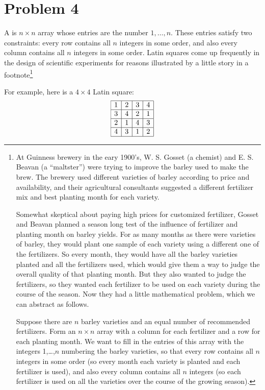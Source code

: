 \documentclass[12pt]{article}
\begin{document}
\section*{Problem 4}

A  is $n \times n$ array whose entries are the number
$1,\dots,n$.  These entries satisfy two constraints: every row contains
all $n$ integers in some order, and also every column contains all $n$
integers in some order.  Latin squares come up frequently in the design of
scientific experiments for reasons illustrated by a little story in a
footnote\footnote{At Guinness brewery in the eary 1900's, W. S. Gosset (a
chemist) and E.  S. Beavan (a ``maltster'') were trying to improve the
barley used to make the brew.  The brewery used different varieties of
barley according to price and availability, and their agricultural
consultants suggested a different fertilizer mix and best planting month
for each variety.

Somewhat skeptical about paying high prices for customized fertilizer,
Gosset and Beavan planned a season long test of the influence of
fertilizer and planting month on barley yields.  For as many months as
there were varieties of barley, they would plant one sample of each
variety using a different one of the fertilizers.  So every month, they
would have all the barley varieties planted and all the fertilizers
used, which would give them a way to judge the overall quality of that
planting month.  But they also wanted to judge the fertilizers, so they
wanted each fertilizer to be used on each variety during the course of
the season.  Now they had a little mathematical problem, which we can
abstract as follows.

Suppose there are $n$ barley varieties and an equal number of
recommended fertilizers.  Form an $n \times n$ array with a column for
each fertilizer and a row for each planting month.  We want to fill in
the entries of this array with the integers 1,\dots,$n$ numbering the
barley varieties, so that every row contains all $n$ integers in some
order (so every month each variety is planted and each fertilizer is
used), and also every column contains all $n$ integers (so each
fertilizer is used on all the varieties over the course of the growing
season).}

For example, here is a $4 \times 4$ Latin square:
{\Large
\[
\begin{array}{|c|c|c|c|}
\hline
1 & 2 & 3 & 4 \\
\hline
3 & 4 & 2 & 1 \\
\hline
2 & 1 & 4 & 3 \\
\hline
4 & 3 & 1 & 2 \\
\hline
\end{array}
\]
}
\end{document}

